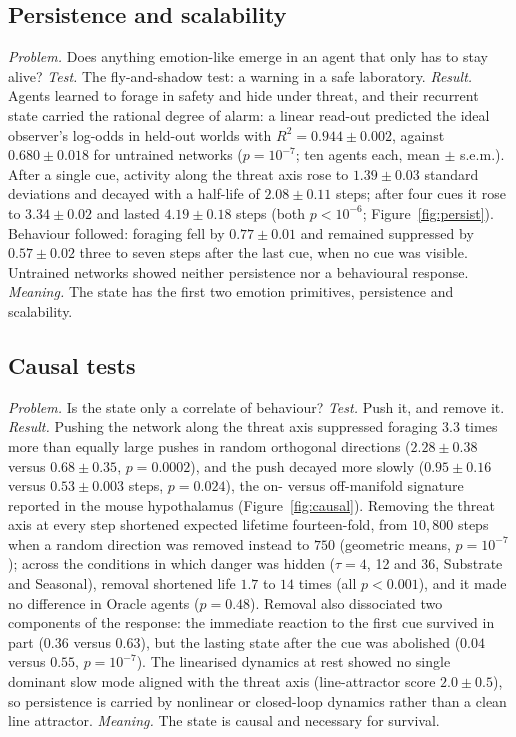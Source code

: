 \documentclass[11pt]{article}
\begin{document}
\subsection{Persistence and scalability}

\emph{Problem.} Does anything emotion-like emerge in an agent that only has to stay alive? \emph{Test.} The fly-and-shadow test: a warning in a safe laboratory. \emph{Result.} Agents learned to forage in safety and hide under threat, and their recurrent state carried the rational degree of alarm: a linear read-out predicted the ideal observer's log-odds in held-out worlds with $R^2=0.944\pm0.002$, against $0.680\pm0.018$ for untrained networks ($p=10^{-7}$; ten agents each, mean $\pm$ s.e.m.). After a single cue, activity along the threat axis rose to $1.39\pm0.03$ standard deviations and decayed with a half-life of $2.08\pm0.11$ steps; after four cues it rose to $3.34\pm0.02$ and lasted $4.19\pm0.18$ steps (both $p<10^{-6}$; Figure~\ref{fig:persist}). Behaviour followed: foraging fell by $0.77\pm0.01$ and remained suppressed by $0.57\pm0.02$ three to seven steps after the last cue, when no cue was visible. Untrained networks showed neither persistence nor a behavioural response. \emph{Meaning.} The state has the first two emotion primitives, persistence and scalability.

\subsection{Causal tests}

\emph{Problem.} Is the state only a correlate of behaviour? \emph{Test.} Push it, and remove it. \emph{Result.} Pushing the network along the threat axis suppressed foraging $3.3$ times more than equally large pushes in random orthogonal directions ($2.28\pm0.38$ versus $0.68\pm0.35$, $p=0.0002$), and the push decayed more slowly ($0.95\pm0.16$ versus $0.53\pm0.003$ steps, $p=0.024$), the on- versus off-manifold signature reported in the mouse hypothalamus \cite{vinograd2024causal} (Figure~\ref{fig:causal}). Removing the threat axis at every step shortened expected lifetime fourteen-fold, from $10{,}800$ steps when a random direction was removed instead to $750$ (geometric means, $p=10^{-7}$); across the conditions in which danger was hidden ($\tau=4$, 12 and 36, Substrate and Seasonal), removal shortened life $1.7$ to $14$ times (all $p<0.001$), and it made no difference in Oracle agents ($p=0.48$). Removal also dissociated two components of the response: the immediate reaction to the first cue survived in part ($0.36$ versus $0.63$), but the lasting state after the cue was abolished ($0.04$ versus $0.55$, $p=10^{-7}$). The linearised dynamics at rest showed no single dominant slow mode aligned with the threat axis (line-attractor score $2.0\pm0.5$), so persistence is carried by nonlinear or closed-loop dynamics rather than a clean line attractor. \emph{Meaning.} The state is causal and necessary for survival.
\end{document}
